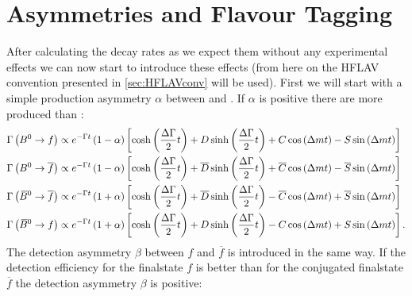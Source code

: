 \section{Asymmetries and Flavour Tagging}

After calculating the decay rates as we expect them without any experimental effects we can now start to introduce these effects
(from here on the HFLAV convention presented in \cref{sec:HFLAVconv} will be used). First we will start with a simple production
asymmetry $\alpha$ between \Bz and \Bzb. If $\alpha$ is positive there are more \Bzb produced than \Bz:
\begin{align*}
  \Gamma\left(B^0\rightarrow f\right) &\propto e^{-\Gamma t}\left(1-\alpha\right)\left[\cosh\left(\frac{\Delta\Gamma}{2}t\right)
  +D\sinh\left(\frac{\Delta\Gamma}{2}t\right)+C\cos\left(\Delta mt\right)-S\sin\left(\Delta mt\right)\right]\\
  \Gamma\left(B^0\rightarrow \overline{f}\right) &\propto e^{-\Gamma t}\left(1-\alpha\right)\left[\cosh\left(\frac{\Delta\Gamma}{2}t\right)
  +\overline{D}\sinh\left(\frac{\Delta\Gamma}{2}t\right)+\overline{C}\cos\left(\Delta mt\right)-\overline{S}\sin\left(\Delta mt\right)\right]\\
  \Gamma\left(\kern 0.18em\overline{\kern -0.18em B}{}^0\rightarrow \overline{f}\right) &\propto e^{-\Gamma t}\left(1+\alpha\right)\left[\cosh\left(\frac{\Delta\Gamma}{2}t\right)
  +\overline{D}\sinh\left(\frac{\Delta\Gamma}{2}t\right)-\overline{C}\cos\left(\Delta mt\right)+\overline{S}\sin\left(\Delta mt\right)\right]\\
  \Gamma\left(\kern 0.18em\overline{\kern -0.18em B}{}^0\rightarrow f\right) &\propto e^{-\Gamma t}\left(1+\alpha\right)\left[\cosh\left(\frac{\Delta\Gamma}{2}t\right)
  +D\sinh\left(\frac{\Delta\Gamma}{2}t\right)-C\cos\left(\Delta mt\right)+S\sin\left(\Delta mt\right)\right].
\end{align*}
The detection asymmetry $\beta$ between $f$ and $\overline{f}$ is introduced in the same way. If the detection efficiency for the finalstate $f$
is better than for the conjugated finalstate $\overline{f}$ the detection asymmetry $\beta$ is positive:
